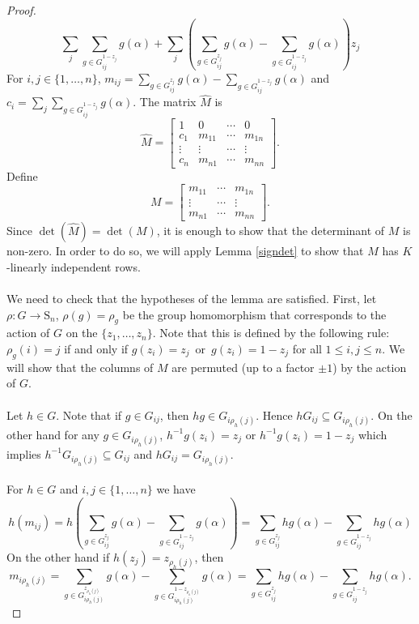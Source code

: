 \documentclass[12pt]{article}
\theoremstyle{plain}
\begin{document}
\begin{proof}
$$\sum_{j}\sum_{g\in G^{1-z_j}_{ij}}g(\alpha)+ \sum_{j}(\sum_{g\in G^{z_j}_{ij}}g(\alpha) -\sum_{g\in G^{1-z_j}_{ij}}g(\alpha))z_j $$
For $i,j \in \lbrace1, \ldots , n \rbrace$, $m_{ij} = \sum_{g\in G^{z_j}_{ij}}g(\alpha) -\sum_{g\in G^{1-z_j}_{ij}}g(\alpha)$ and $c_i = \sum_{j}\sum_{g\in G^{1-z_j}_{ij}}g(\alpha)$. The matrix $\hat{M}$ is 
$$\hat{M} = \begin{bmatrix}
1 & 0 & \cdots & 0\\
c_1 & m_{11} & \cdots & m_{1n}\\
\vdots & \vdots & \cdots & \vdots\\
c_{n} & m_{n1} & \cdots	& m_{nn}
\end{bmatrix}.
$$
Define  
$$M = \begin{bmatrix}
 m_{11} & \cdots & m_{1n}\\
 \vdots & \cdots & \vdots\\
 m_{n1} & \cdots	& m_{nn}
\end{bmatrix}.$$
Since $\det(\hat{M}) = \det (M)$, it is enough to show that the determinant of $M$ is non-zero. In order to do so, we will apply Lemma \ref{signdet} to show that $M$ has $K$-linearly independent rows. \\
\\
We need to check that the hypotheses of the lemma are satisfied. First, let $\rho: G \longrightarrow \mathrm{S}_n$, $\rho(g) = \rho_g$ be the group homomorphism that corresponds to the action of $G$ on the $\lbrace z_1, \ldots , z_n \rbrace$. Note that this is defined by the following rule: $\rho_g(i) = j$ if and only if $g(z_i) = z_j \,\,\, \text{or} \,\,\, g(z_i) = 1- z_j$ for all $1 \leq i,j\leq n$. We will show that the columns of $M$ are permuted (up to a factor $\pm 1$) by the action of $G$. \\
\\
Let $h \in G$. Note that if $g \in G_{ij}$, then $hg \in G_{i\rho_h(j)}$. Hence $hG_{ij} \subseteq G_{i\rho_h(j)}$. On the other hand for any $g \in G_{i\rho_h(j)}$, $h^{-1}g(z_i) = z_j$ or $h^{-1}g(z_i) = 1- z_j$ which implies $h^{-1}G_{i\rho_h(j)} \subseteq G_{ij}$ and $hG_{ij} = G_{i\rho_h(j)}$.\\
\\
For $h \in G$ and $i,j \in \lbrace 1, \ldots , n \rbrace$ we have
$$h(m_{ij}) = h( \sum_{g\in G^{z_j}_{ij}}g(\alpha) -\sum_{g\in G^{1-z_j}_{ij}}g(\alpha)) =  \sum_{g\in G^{z_j}_{ij}}hg(\alpha) -\sum_{g\in G^{1-z_j}_{ij}}hg(\alpha)$$
On the other hand if $h(z_j) = z_{\rho_h(j)}$, then
$$m_{i\rho_h(j)} =  \sum_{g\in G^{z_{\rho_h(j)}}_{i\rho_h(j)}}g(\alpha) -\sum_{g\in G^{1-z_{\rho_h(j)}}_{i\rho_h(j)}}g(\alpha) = \sum_{g\in G^{z_j}_{ij}}hg(\alpha) -\sum_{g\in G^{1-z_{j}}_{ij}}hg(\alpha).$$

\end{proof}
\end{document}
